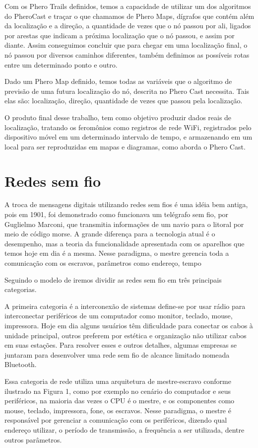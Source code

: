 \documentclass[12pt, %
openright, 
oneside,
a4paper,
brazil]{facom-ufu-abntex2}
\begin{document}
	Com os Phero Trails definidos, temos a capacidade de utilizar um dos algoritmos do PheroCast e traçar o que chamamos de Phero Maps, dígrafos que contém além da localização e a direção, a quantidade de vezes que o nó passou por ali, ligados por arestas que indicam a próxima localização que o nó passou, e assim por diante. Assim conseguimos concluir que para chegar em uma localização final, o nó passou por diversos caminhos diferentes, também definimos as possíveis rotas entre um determinado ponto e outro.
	
	Dado um Phero Map definido, temos todas as variáveis que o algoritmo de previsão de uma futura localização do nó, descrita no Phero Cast necessita. Tais elas são: localização, direção, quantidade de vezes que passou pela localização. 
	
 	O produto final desse trabalho, tem como objetivo produzir dados reais de localização, tratando os feromônios como registros de rede \ac{WiFi}, registrados pelo dispositivo móvel em um determinado intervalo de tempo, e armazenando em um local para ser reproduzidas em mapas e diagramas, como aborda o Phero Cast.

\section{Redes sem fio}
A troca de mensagens digitais utilizando redes sem fios é uma idéia bem antiga, pois em 1901, foi demonstrado como funcionava um telégrafo sem fio, por Guglielmo Marconi, que transmitia informações de um navio para o litoral por meio de código morse. A grande diferença para a tecnologia atual é o desempenho, mas a teoria da funcionalidade apresentada com os aparelhos que temos hoje em dia é a mesma. Nesse paradigma, o mestre gerencia toda a comunicação com os escravos, parâmetros como endereço, tempo 

Seguindo o modelo de \cite{tanenbaum2003redes} iremos dividir as redes sem fio em três principais categorias.

A primeira categoria é a interconexão de sistemas define-se por usar rádio para interconectar periféricos de um computador como monitor, teclado, mouse, impressora. Hoje em dia alguns usuários têm dificuldade para conectar os cabos à unidade principal, outros preferem por estética e organização não utilizar cabos em suas estações. Para resolver esses e outros detalhes, algumas empresas se juntaram para desenvolver uma rede sem fio de alcance limitado nomeada Bluetooth.

Essa categoria de rede utiliza uma arquitetura de mestre-escravo conforme ilustrado na Figura 1, como por exemplo no cenário do computador e seus periféricos, na maioria das vezes o CPU é o mestre, e os componentes como mouse, teclado, impressora, fone, os escravos. Nesse paradigma, o mestre é responsável por gerenciar a comunicação com os periféricos, dizendo qual endereço utilizar, o período de transmissão, a frequência a ser utilizada, dentre outros parâmetros.
\end{document}
